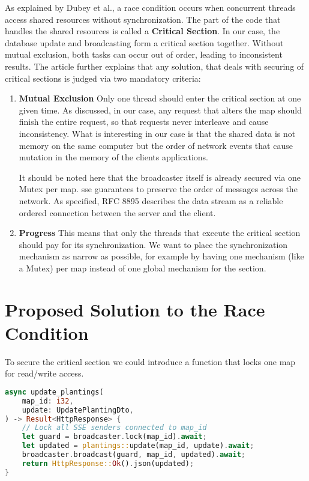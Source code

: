 \documentclass[final,oneside]{vutinfth}
\begin{document}
As explained by Dubey et al.\cite{artice_race_condition_and_dynamic_data_race_detection}, a race condition occurs when concurrent threads access shared resources without synchronization.
The part of the code that handles the shared resources is called a \textbf{Critical Section}.
In our case, the database update and broadcasting form a critical section together.
Without mutual exclusion, both tasks can occur out of order, leading to inconsistent results.
The article \cite{artice_race_condition_and_dynamic_data_race_detection} further explains that any solution, that deals with securing of critical sections is judged via two mandatory criteria: 
\begin{enumerate}
    \item \textbf{Mutual Exclusion}
    Only one thread should enter the critical section at one given time.
    As discussed, in our case, any request that alters the map should finish the entire request, so that requests never interleave and cause inconsistency.
    What is interesting in our case is that the shared data is not memory on the same computer but the order of network events that cause mutation in the memory of the clients applications.

    It should be noted here that the broadcaster itself is already secured via one Mutex per map.
    \gls{sse} guarantees to preserve the order of messages across the network.
    As specified, RFC 8895 \cite{rfc8895sse} describes the data stream as a reliable ordered connection between the server and the client.
    
    \item \textbf{Progress}
    This means that only the threads that execute the critical section should pay for its synchronization.
    We want to place the synchronization mechanism as narrow as possible, for example by having one mechanism (like a Mutex) per map instead of one global mechanism for the section.
\end{enumerate}

\section{Proposed Solution to the Race Condition}
\label{proposedsolution}

To secure the critical section we could introduce a function that locks one map for read/write access.

\begin{minipage}{\linewidth}
\begin{lstlisting}[language=rust]
async update_plantings(
    map_id: i32,
    update: UpdatePlantingDto,
) -> Result<HttpResponse> {
    // Lock all SSE senders connected to map_id 
    let guard = broadcaster.lock(map_id).await;
    let updated = plantings::update(map_id, update).await;
    broadcaster.broadcast(guard, map_id, updated).await;
    return HttpResponse::Ok().json(updated);
}
\end{lstlisting}
\end{minipage}
\end{document}

